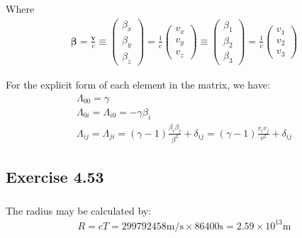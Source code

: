 \documentclass[]{ctexart}
\begin{document}
			Where 
				\begin{equation*}
				\begin{aligned}
					\boldsymbol{\beta}=\frac{\mathbf{v}}{c} \equiv\left(\begin{array}{c}
					\beta_{x} \\
					\beta_{y} \\
					\beta_{z}
					\end{array}\right)=\frac{1}{c}\left(\begin{array}{l}
					v_{x} \\
					v_{y} \\
					v_{z}
					\end{array}\right) \equiv\left(\begin{array}{l}
					\beta_{1} \\
					\beta_{2} \\
					\beta_{3}
					\end{array}\right)=\frac{1}{c}\left(\begin{array}{l}
					v_{1} \\
					v_{2} \\
					v_{3}
					\end{array}\right)
				\end{aligned}
				\end{equation*}
			
			For the explicit form of each element in the matrix, we have:
				\begin{equation*}
				\begin{array}{l}
					\Lambda_{00}=\gamma \\
					\Lambda_{0 i}=\Lambda_{i 0}=-\gamma \beta_{i} \\
					\Lambda_{i j}=\Lambda_{j i}=(\gamma-1) \frac{\beta_{i} \beta_{j}}{\beta^{2}}+\delta_{i j}=(\gamma-1) \frac{v_{i} v_{j}}{v^{2}}+\delta_{i j}
				\end{array}
				\end{equation*}
	
	\subsection{Exercise 4.53}
		\subsubsection{}
			The radius may be calculated by:
				\begin{equation*}
				\begin{aligned}
					R=cT=299792458\text{m/s} \times 86400\text{s}=2.59\times 10^{13}\text{m}
				\end{aligned}
				\end{equation*}
		
\end{document}
